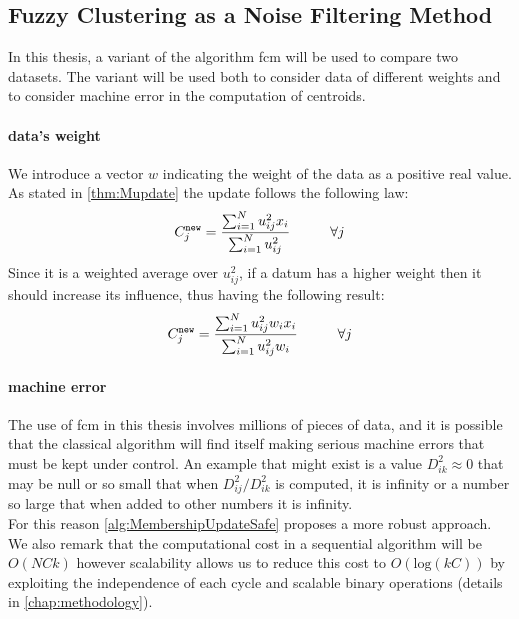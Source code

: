 \begin{toReview}
\subsection{Fuzzy Clustering as a Noise Filtering Method}
In this thesis, a variant of the algorithm \gls{fcm} will be used to compare two datasets. The variant will be used both to consider data of different weights and to consider machine error in the computation of centroids.
\paragraph{data's weight}
We introduce a vector $w$ indicating the weight of the data as a positive real value. As stated in \cref{thm:Mupdate} the update follows the following law:
\[
C^{\texttt{new}}_j = \frac{\sum_{i=1}^Nu_{ij}^2x_{i}}{\sum_{i=1}^Nu_{ij}^2} \text{\hspace{1cm}} \forall j
\]
Since it is a weighted average over $u_{ij}^2$, if a datum has a higher weight then it should increase its influence, thus having the following result:
\[
C^{\texttt{new}}_j = \frac{\sum_{i=1}^Nu_{ij}^2w_{i}x_{i}}{\sum_{i=1}^Nu_{ij}^2w_{i}} \text{\hspace{1cm}} \forall j
\]

\paragraph{machine error}
The use of \gls{fcm} in this thesis involves millions of pieces of data, and it is possible that the classical algorithm will find itself making serious machine errors that must be kept under control. An example that might exist is a value $D_{ik}^2 \approx 0$ that may be null or so small that when $D_{ij}^2 / D_{ik}^2$ is computed, it is infinity or a number so large that when added to other numbers it is infinity.\\ For this reason \cref{alg:MembershipUpdateSafe} proposes a more robust approach. We also remark that the computational cost in a sequential algorithm will be $O(NCk)$  however scalability allows us to reduce this cost to $O(\text{log}(kC))$ by exploiting the independence of each cycle and scalable binary operations (details in \cref{chap:methodology}).


\end{toReview}
